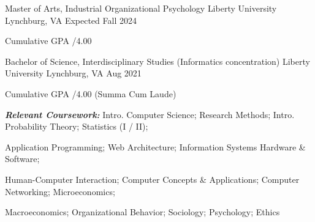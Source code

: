 


\begin{cventries}

\cventry
{Master of Arts, Industrial Organizational Psychology} %
{Liberty University} %
{Lynchburg, VA} %
{Expected Fall 2024} %
{ %
	\begin{cvitems}
		\item {Cumulative GPA \textemdash{}/4.00}
	\end{cvitems}
}

\cventry
{Bachelor of Science, Interdisciplinary Studies (Informatics concentration)} %
{Liberty University} %
{Lynchburg, VA} %
{Aug 2021} %
{ %
	\begin{cvitems}
		\item {Cumulative GPA \textemdash{}/4.00 (Summa Cum Laude)}
		\item {}%
		\item {\textbf{\textit{Relevant Coursework:}} Intro. Computer Science; Research Methods; Intro. Probability Theory; Statistics (I / II); }
		\item {Application Programming; Web Architecture; Information Systems Hardware \& Software; }
		\item {Human-Computer Interaction; Computer Concepts \& Applications; Computer Networking; Microeconomics; }
		\item {Macroeconomics; Organizational Behavior; Sociology; Psychology; Ethics}
	\end{cvitems}
}



\end{cventries}